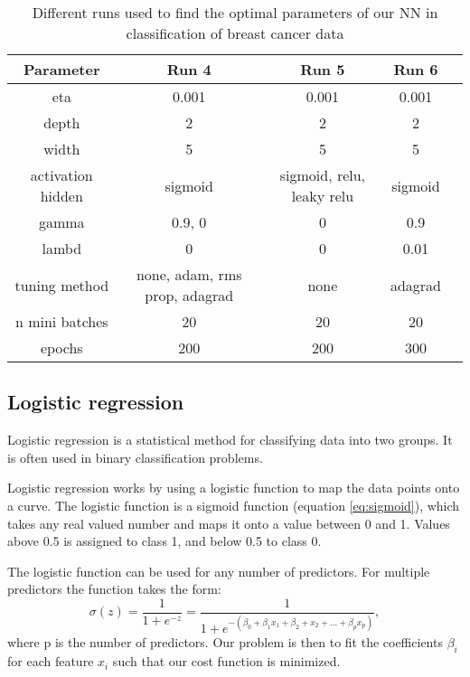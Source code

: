 \begin{table}[H]
    \centering
    \caption{Different runs used to find the optimal parameters of our NN in
    classification of breast cancer data}  
    \label{tab:runs_classification_cancer2} 
    \begin{tabular}{|c|c|c|c|c|}
        \hline

        Parameter & Run 4 & Run 5 & Run 6\\
        \hline
        eta & 0.001 & 0.001 & 0.001\\
        \hline
        depth & 2  & 2 & 2\\
        \hline
        width & 5   & 5 & 5\\
        \hline
        activation hidden & sigmoid & sigmoid, relu, leaky relu & sigmoid\\
        \hline
        gamma & 0.9, 0 & 0 & 0.9\\
        \hline
        lambd & 0  & 0 & 0.01\\
        \hline
        tuning method & none, adam, rms prop, adagrad  & none & adagrad\\
        \hline
        n mini batches & 20  & 20 & 20\\
        \hline
        epochs & 200  & 200 & 300\\
        \hline
         
    \end{tabular} 
\end{table}


\subsection{Logistic regression}

Logistic regression is a statistical method for classifying data into two
groups. It is often used in binary classification problems.

Logistic regression works by using a logistic function to map the data points
onto a curve. The logistic function is a sigmoid function (equation
\ref{eq:sigmoid}), which takes any real
valued number and maps it onto a value between 0 and 1. 
Values above 0.5 is assigned to class 1, and below 0.5 to class 0. 

The logistic function can be used for any number of predictors. For multiple
predictors the function takes the form: 
\begin{equation*}
    \label{eq:log_reg} 
    \sigma (z) = \frac{1}{1+e^{-z}} =\frac{1}{1+e^{-(\beta_0 + \beta _1 x_1+ \beta_2 +x_2 + \ldots +
    \beta _p x_p)}}, 
\end{equation*}
where p is the number of predictors. Our problem is then to fit the
coefficients $\beta _i$ for each feature $x_i$ such that our cost function is
minimized.  

